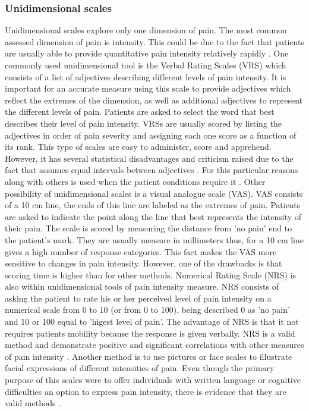  \subsubsection{Unidimensional scales}
Unidimensional scales explore only one dimension of pain. The most common assessed dimension of pain is intensity. This could be due to the fact that patients are usually able to provide quantitative pain intensity relatively rapidly \cite{libro pain}. One commonly used unidimensional tool is the Verbal Rating Scales (VRS) which consists of a list of adjectives describing different levels of pain intensity. It is important for an accurate measure using this scale to provide adjectives which reflect the extremes of the dimension, as well as additional adjectives to represent the different levels of pain. Patients are asked to select the word that best describes their level of pain intensity. VRSs are usually scored by listing the adjectives in order of pain severity and assigning each one score as a function of its rank. This type of scales are easy to administer, score and apprehend. However, it has several statistical disadvantages and criticism raised due to the fact that assumes equal intervals between adjectives \cite{libro pain}. For this particular reasons along with others is used when the patient conditions require it \cite{six methods paper}. Other possibility of unidimensional scales is a visual analogue scale (VAS). VAS consists of a 10 cm line, the ends of this line are labeled as the extremes of pain. Patients are asked to indicate the point along the line that best represents the intensity of their pain. The scale is scored by measuring the distance from 'no pain' end to the patient's mark. They are usually measure in millimeters thus, for a 10 cm line gives a high number of response categories. This fact makes the VAS more sensitive to changes in pain intensity. However, one of the drawbacks is that scoring time is higher than for other methods. Numerical Rating Scale (NRS) is also within unidimensional tools of pain intensity measure. NRS consists of asking the patient to rate his or her perceived level of pain intensity on a numerical scale from 0 to 10 (or from 0 to 100), being described 0 as 'no pain' and  10 or 100 equal to 'higest level of pain'. The advantage of NRS is that it not requires patients mobility because the response is given verbally. NRS is a valid method and demonstrate positive and significant correlations with other measures of pain intensity \cite{six methods paper}. Another method is to use pictures or face scales to illustrate facial expressions of different intensities of pain. Even though the primary purpose of this scales were to offer individuals with written language or cognitive difficulties an option to express pain intensity, there is evidence that they are valid methods \cite{libro pain}. 

